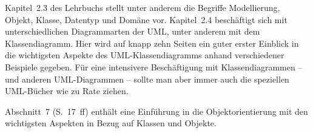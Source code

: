 {Kapitel~2.3 des Lehrbuchs stellt unter anderem die Begriffe Modellierung, Objekt, Klasse, Datentyp und Domäne vor. Kapitel~2.4 beschäftigt sich mit unterschiedlichen Diagrammarten der UML, unter anderem mit dem Klassendiagramm. Hier wird auf knapp zehn Seiten ein guter erster Einblick in die wichtigsten Aspekte des UML-Klassendiagramms anhand verschiedener Beispiele gegeben. Für eine intensivere Beschäftigung mit Klassendiagrammen – und anderen UML-Diagrammen – sollte man aber immer auch die speziellen UML-Bücher wie \cite{kec18} zu Rate ziehen.}

{Abschnitt~7 (S.~17~ff) enthält eine Einführung in die Objektorientierung mit den wichtigsten Aspekten in Bezug auf Klassen und Objekte.}

